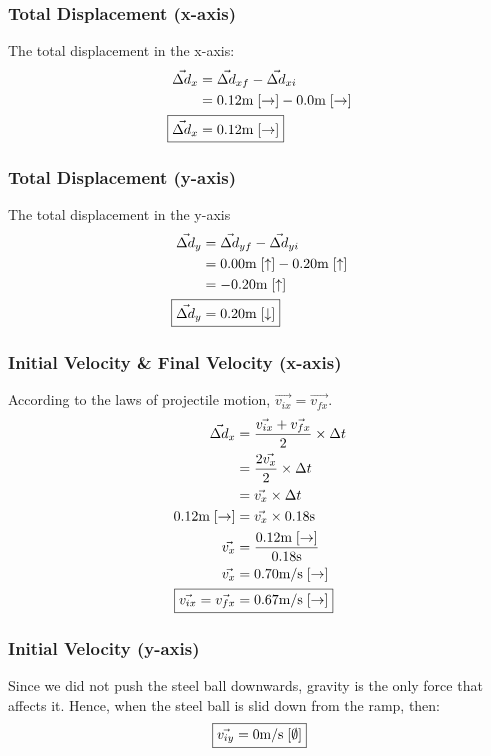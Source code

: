\documentclass[a4paper,12pt]{article}
\begin{document}
	\subsubsection{Total Displacement (x-axis)}
	The total displacement in the x-axis:
	\begin{align*}
		\vec{\Delta d}_x&=\vec{\Delta d}_{xf}-\vec{\Delta d}_{xi}\\
		&=0.12 \text{m}\;[\rightarrow]-0.0 \text{m}\; [\rightarrow]\\
		\Aboxed{\vec{\Delta d}_x&=0.12\text{m}\; [\rightarrow]}
	\end{align*}
	\subsubsection{Total Displacement (y-axis)}
	The total displacement in the y-axis
	\begin{align*}
		\vec{\Delta d}_y&=\vec{\Delta d}_{yf}-\vec{\Delta d}_{yi}\\
		&=0.00 \text{m}\; [\uparrow]-0.20 \text{m}\; [\uparrow]\\
		&=-0.20\text{m}\; [\uparrow]\\
		\Aboxed{\vec{\Delta d}_y&=0.20\text{m}\; [\downarrow]}
	\end{align*}
	\subsubsection{Initial Velocity \& Final Velocity (x-axis)}
	According to the laws of projectile motion, $\vec{v_{ix}}=\vec{v_{fx}}$.
	\begin{align*}
		\vec{\Delta d}_x&=\frac{\vec{v_{ix}}+\vec{v_{fx}}}{2}\times \Delta t\\
		&=\frac{2\vec{v_x}}{2}\times \Delta t\\
		&=\vec{v_x}\times \Delta t\\
		0.12\text{m}\; [\rightarrow]&=\vec{v_x} \times 0.18\text{s}\\
		\vec{v_x}&=\frac{0.12\text{m}\; [\rightarrow]}{0.18\text{s}}\\
		\vec{v_x}&=0.70\text{m}/\text{s}\;[\rightarrow]\\
		\Aboxed{\vec{v_{ix}}=\vec{v_{fx}}&=0.67\text{m}/\text{s}\;[\rightarrow]}
	\end{align*}
	\subsubsection{Initial Velocity (y-axis)}
	Since we did not push the steel ball downwards, gravity is the only force that affects it. Hence, when the steel ball is slid down from the ramp, then:
	\begin{align*}
		\Aboxed{\vec{v_{iy}}&=0\text{m}/\text{s}\;[\emptyset]}\\
	\end{align*}
\end{document}
